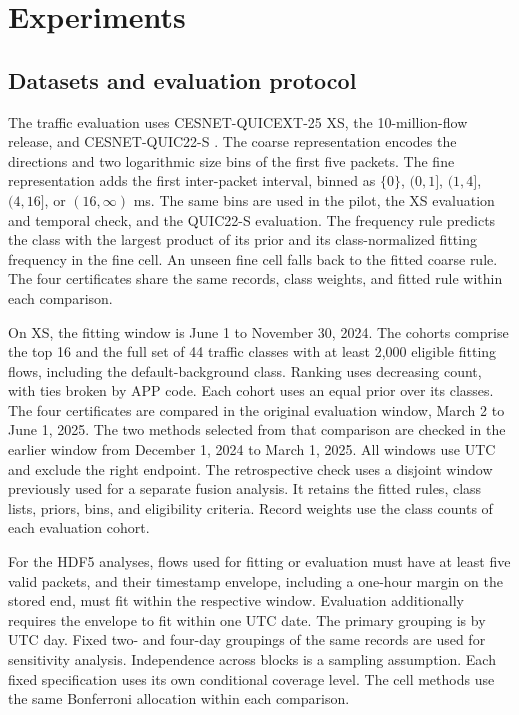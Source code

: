 \documentclass[preprint,11pt]{elsarticle}
\begin{document}
\section{Experiments}
\label{sec:experiments}

\subsection{Datasets and evaluation protocol}

The traffic evaluation uses CESNET-QUICEXT-25 XS, the 10-million-flow release, and CESNET-QUIC22-S \cite{cesnet2025cesnet,luxemburk2023cesnet}. The coarse representation encodes the directions and two logarithmic size bins of the first five packets. The fine representation adds the first inter-packet interval, binned as $\{0\}$, $(0,1]$, $(1,4]$, $(4,16]$, or $(16,\infty)$ ms. The same bins are used in the pilot, the XS evaluation and temporal check, and the QUIC22-S evaluation. The frequency rule predicts the class with the largest product of its prior and its class-normalized fitting frequency in the fine cell. An unseen fine cell falls back to the fitted coarse rule. The four certificates share the same records, class weights, and fitted rule within each comparison.

On XS, the fitting window is June 1 to November 30, 2024. The cohorts comprise the top 16 and the full set of 44 traffic classes with at least 2{,}000 eligible fitting flows, including the default-background class. Ranking uses decreasing count, with ties broken by APP code. Each cohort uses an equal prior over its classes. The four certificates are compared in the original evaluation window, March 2 to June 1, 2025. The two methods selected from that comparison are checked in the earlier window from December 1, 2024 to March 1, 2025. All windows use UTC and exclude the right endpoint. The retrospective check uses a disjoint window previously used for a separate fusion analysis. It retains the fitted rules, class lists, priors, bins, and eligibility criteria. Record weights use the class counts of each evaluation cohort.

For the HDF5 analyses, flows used for fitting or evaluation must have at least five valid packets, and their timestamp envelope, including a one-hour margin on the stored end, must fit within the respective window. Evaluation additionally requires the envelope to fit within one UTC date. The primary grouping is by UTC day. Fixed two- and four-day groupings of the same records are used for sensitivity analysis. Independence across blocks is a sampling assumption. Each fixed specification uses its own conditional coverage level. The cell methods use the same Bonferroni allocation within each comparison.
\end{document}
